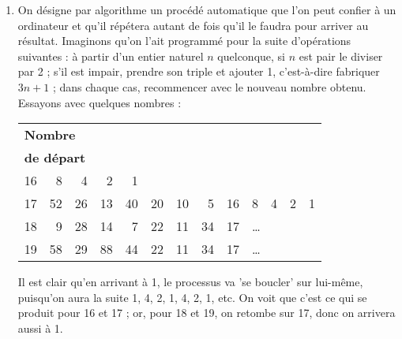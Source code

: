 \begin{enumerate}
\begin{enumerate}
\begin{itemize}
	   \item en cas de hausse : $x + 0,1x = 1,1x$.

	   \end{itemize} 

	   \item Un algorithme est g\'en\'eralement r\'ep\'etitif ; c'est le cas si on
	   place une somme d'argent \`a la banque \`a un taux de 4~\% ; au bout d'une
	   ann\'ee, elle devient les 104/100 de ce qu'elle \'etait, au bout de deux
	   ann\'ees les 104/100 des 104/100 de ce qu'elle \'etait, etc.

	   En d\'esignant cette somme par S, on a donc, au bout de $n$ ann\'ees, une
	   somme :

	   \[S_{n} = \underbrace{(104/100)(104/100) \ldots
	   (104/100)}_{{\it n} {\rm fois}}S = 1,04^{n}S\]

      \end{enumerate} 

\item On d\'esigne par algorithme un proc\'ed\'e automatique que l'on peut confier \`a
      un ordinateur et qu'il r\'ep\'etera autant de fois qu'il le faudra pour
	  arriver au r\'esultat. Imaginons qu'on l'ait programm\'e pour la suite
	  d'op\'erations suivantes : \`a partir d'un entier naturel $n$ quelconque, si
	  $n$ est pair le diviser par 2 ; s'il est impair, prendre son triple et
	  ajouter 1, c'est-\`a-dire fabriquer $3n+1$ ; dans chaque cas, recommencer
	  avec le nouveau nombre obtenu. Essayons avec quelques nombres :

	  \begin{tabular}{rrrrrrrrrrrrr}
	  \multicolumn{13}{l}{\footnotesize \bf Nombre}\\
	  \multicolumn{13}{l}{\footnotesize \bf de d\'epart}\\
	  16 & 8 & 4 & 2 & 1 \\
	  17 & 52 & 26 & 13 & 40 & 20 & 10 & 5 & 16 & 8 & 4 & 2 & 1 \\
	  18 & 9 & 28 & 14 & 7 & 22 & 11 & 34 & 17 & \multicolumn{4}{l}{\ldots} \\
	  19 & 58 & 29 & 88 & 44 & 22 & 11 & 34 & 17 & \multicolumn{4}{l}{\ldots} \\
	  \end{tabular} 

	  Il est clair qu'en arrivant \`a 1, le processus va 'se boucler' sur
	  lui-m\^eme, puisqu'on aura la suite 1, 4, 2, 1, 4, 2, 1, etc. On voit que
	  c'est ce qui se produit pour 16 et 17 ; or, pour 18 et 19, on retombe
	  sur 17, donc on arrivera aussi \`a 1.


\end{enumerate}
